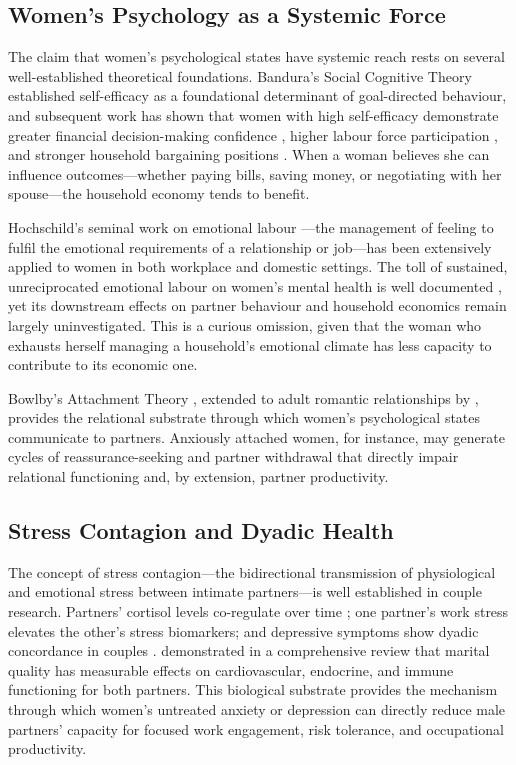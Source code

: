 \documentclass[12pt, a4paper]{article}
\begin{document}
\subsection{Women's Psychology as a Systemic Force}

The claim that women's psychological states have systemic reach rests on several well-established theoretical foundations. Bandura's Social Cognitive Theory \citep{bandura1977} established self-efficacy as a foundational determinant of goal-directed behaviour, and subsequent work has shown that women with high self-efficacy demonstrate greater financial decision-making confidence \citep{lusardi2014}, higher labour force participation \citep{eccles1994}, and stronger household bargaining positions \citep{sen1990}. When a woman believes she can influence outcomes—whether paying bills, saving money, or negotiating with her spouse—the household economy tends to benefit.

Hochschild's seminal work on emotional labour \citep{hochschild1983}—the management of feeling to fulfil the emotional requirements of a relationship or job—has been extensively applied to women in both workplace and domestic settings. The toll of sustained, unreciprocated emotional labour on women's mental health is well documented \citep{erickson2005, wharton1993}, yet its downstream effects on partner behaviour and household economics remain largely uninvestigated. This is a curious omission, given that the woman who exhausts herself managing a household's emotional climate has less capacity to contribute to its economic one.

Bowlby's Attachment Theory \citep{bowlby1969}, extended to adult romantic relationships by \citet{hazan1987}, provides the relational substrate through which women's psychological states communicate to partners. Anxiously attached women, for instance, may generate cycles of reassurance-seeking and partner withdrawal that directly impair relational functioning and, by extension, partner productivity.

\subsection{Stress Contagion and Dyadic Health}

The concept of stress contagion—the bidirectional transmission of physiological and emotional stress between intimate partners—is well established in couple research. Partners' cortisol levels co-regulate over time \citep{saxbe2010}; one partner's work stress elevates the other's stress biomarkers; and depressive symptoms show dyadic concordance in couples \citep{kouros2011}. \citet{kiecolt2001} demonstrated in a comprehensive review that marital quality has measurable effects on cardiovascular, endocrine, and immune functioning for both partners. This biological substrate provides the mechanism through which women's untreated anxiety or depression can directly reduce male partners' capacity for focused work engagement, risk tolerance, and occupational productivity.
\end{document}
